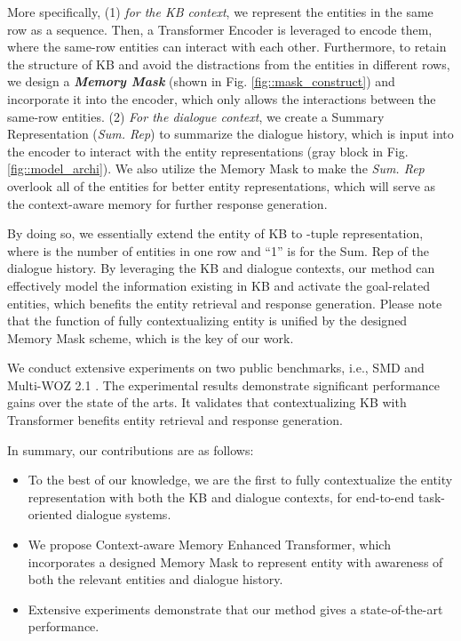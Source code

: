 \documentclass[11pt]{article}
\begin{document}
More specifically, (1) \textit{for the KB context}, we represent the entities in the same row as a sequence. Then, a Transformer Encoder \cite{vaswani-2017-attention} is leveraged to encode them, where the same-row entities can interact with each other. Furthermore, to retain the structure of KB and avoid the distractions from the entities in different rows, we design a \textit{\textbf{Memory Mask}} (shown in Fig. \ref{fig::mask_construct}) and incorporate it into the encoder, which only allows the interactions between the same-row entities.
(2) \textit{For the dialogue context}, we create a Summary Representation (\textit{Sum. Rep}) to summarize the dialogue history, which is input into the encoder to interact with the entity representations (gray block in Fig. \ref{fig::model_archi}). We also utilize the Memory Mask to make the \textit{Sum. Rep} overlook all of the entities for better entity representations, which will serve as the context-aware memory for further response generation.

By doing so, we essentially extend the entity of KB to -tuple representation, where  is the number of entities in one row and ``1'' is for the Sum. Rep of the dialogue history.
By leveraging the KB and dialogue contexts, our method can effectively model the information existing in KB and activate the goal-related entities, which benefits the entity retrieval and response generation.
Please note that the function of fully contextualizing entity is unified by the designed Memory Mask scheme, which is the key of our work. 


We conduct extensive experiments on two public benchmarks, i.e., SMD \cite{eric-etal-2017-key, madotto-etal-2018-mem2seq} and Multi-WOZ 2.1 \cite{budzianowski-etal-2018-multiwoz, yang-etal-2020-graphdialog}. 
The experimental results demonstrate significant performance gains over the state of the arts. It validates that contextualizing KB with Transformer benefits entity retrieval and response generation.

In summary, our contributions are as follows:
\begin{itemize}
    \item To the best of our knowledge, we are the first to fully contextualize the entity representation with both the KB and dialogue contexts, for end-to-end task-oriented dialogue systems.
    \item We propose Context-aware Memory Enhanced Transformer, which incorporates a designed Memory Mask to represent entity with awareness of both the relevant entities and dialogue history.
    \item Extensive experiments demonstrate that our method gives a state-of-the-art performance.
\end{itemize}
\end{document}
